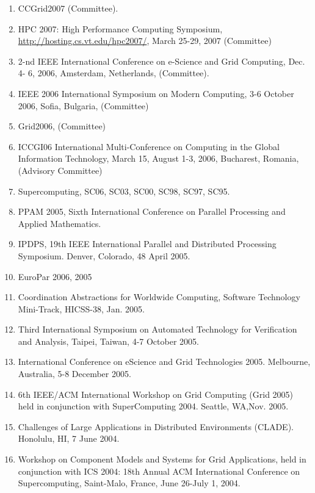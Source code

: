 \documentclass{article}
\begin{document}
\begin{enumerate}
\item  CCGrid2007 (Committee). 
\item  HPC 2007: High Performance Computing Symposium, \url{http://hosting.cs.vt.edu/hpc2007/}, March 25-29, 2007 (Committee) 
\item  2-nd IEEE International Conference on e-Science and Grid Computing, Dec. 4- 6, 2006, Amsterdam, Netherlands, (Committee). %
\item  IEEE 2006 International Symposium on Modern Computing, 3-6 October 2006, Sofia, Bulgaria, (Committee) 
\item  Grid2006, (Committee) 
\item  ICCGI06 International Multi-Conference on Computing in the Global Information Technology, March 15, August 1-3, 2006, Bucharest, Romania, (Advisory Committee) 
\item  Supercomputing, SC06, SC03, SC00, SC98, SC97, SC95.
\item  PPAM 2005, Sixth International Conference on Parallel Processing and Applied Mathematics.
\item  IPDPS, 19th IEEE International Parallel and Distributed Processing Symposium. Denver, Colorado, 48 April 2005. 
\item  EuroPar 2006, 2005 
\item  Coordination Abstractions for Worldwide Computing, Software Technology Mini-Track, HICSS-38, Jan. 2005. %
\item  Third International Symposium on Automated Technology for Verification and Analysis, Taipei, Taiwan, 4-7 October 2005. 
\item  International Conference on eScience and Grid Technologies 2005. Melbourne, Australia, 5-8 December 2005. 
\item  6th IEEE/ACM International Workshop on Grid Computing (Grid 2005) held in conjunction with SuperComputing 2004. Seattle, WA,Nov. 2005.  %
\item  Challenges of Large Applications in Distributed Environments (CLADE). Honolulu, HI, 7 June 2004. 
\item  Workshop on Component Models and Systems for Grid Applications, held in conjunction with ICS 2004: 18th Annual ACM International Conference on Supercomputing, Saint-Malo, France, June 26-July 1, 2004. 

\end{enumerate}
\end{document}
